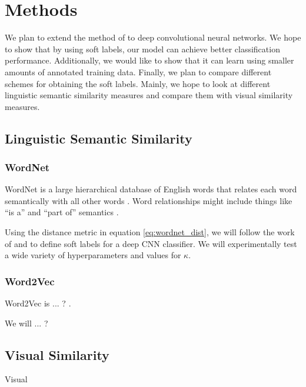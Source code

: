 \section{Methods}

We plan to extend the method of \cite{zhao2011large} to deep convolutional
neural networks. We hope to show that by using soft labels, our model can
achieve better classification performance. Additionally, we would like to
show that it can learn using smaller amounts of annotated training data.
Finally, we plan to compare different schemes for obtaining the soft labels.
Mainly, we hope to look at different linguistic semantic similarity measures
and compare them with visual similarity measures.



\subsection{Linguistic Semantic Similarity}


\subsubsection{WordNet}

WordNet is a large hierarchical database of English words that relates each
word semantically with all other words \cite{miller1995wordnet}. Word
relationships might include things like ``is a'' and ``part of'' semantics
\cite{marszalek2007semantic}.

Using the distance metric in equation \ref{eq:wordnet_dist}, we will follow the
work of \cite{fergus2010semantic} and \cite{zhao2011large} to define soft
labels for a deep CNN classifier. We will experimentally test a wide variety of
hyperparameters and values for $\kappa$.


\subsubsection{Word2Vec}

Word2Vec is ... ? \cite{mikolov2013distributed}.

We will ... ?



\subsection{Visual Similarity}

Visual
